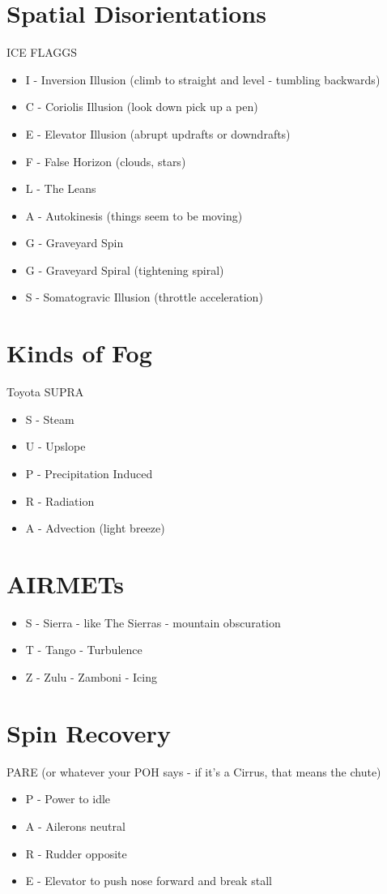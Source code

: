 \section{Spatial Disorientations}

ICE FLAGGS

\begin{itemize}
\item I - Inversion Illusion (climb to straight and level - tumbling backwards)
\item C - Coriolis Illusion (look down pick up a pen)
\item E - Elevator Illusion (abrupt updrafts or downdrafts)
\item F - False Horizon (clouds, stars)
\item L - The Leans 
\item A - Autokinesis (things seem to be moving)
\item G - Graveyard Spin
\item G - Graveyard Spiral (tightening spiral)
\item S - Somatogravic Illusion (throttle acceleration)
\end{itemize}

\section{Kinds of Fog}

Toyota SUPRA

\begin{itemize}
    \item S - Steam
    \item U - Upslope
    \item P - Precipitation Induced
    \item R - Radiation
    \item A - Advection (light breeze)
\end{itemize}

\section{AIRMETs}

\begin{itemize}
    \item S - Sierra - like The Sierras - mountain obscuration
    \item T - Tango - Turbulence
    \item Z - Zulu - Zamboni - Icing
\end{itemize}

\section{Spin Recovery}

PARE (or whatever your POH says - if it's a Cirrus, that means the chute)

\begin{itemize}
    \item P - Power to idle
    \item A - Ailerons neutral
    \item R - Rudder opposite
    \item E - Elevator to push nose forward and break stall
\end{itemize}



